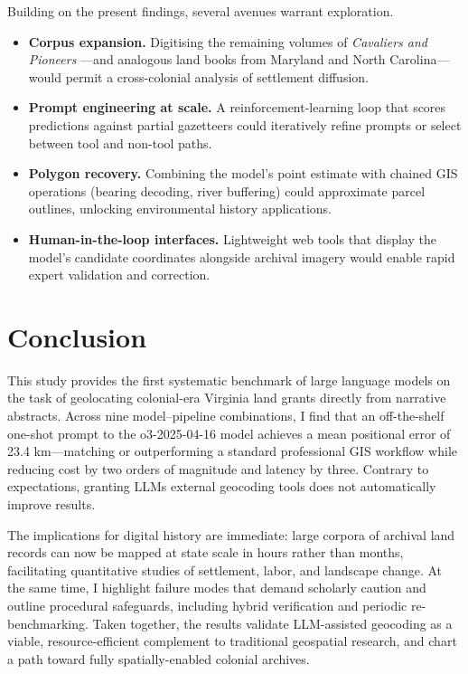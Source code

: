 Building on the present findings, several avenues warrant exploration.

\begin{itemize}
\tightlist
\item
  \textbf{Corpus expansion.} Digitising the remaining volumes of
  \emph{Cavaliers and Pioneers} \citep{Nugent1979_cavaliers3}---and
  analogous land books from Maryland and North Carolina---would permit a
  cross-colonial analysis of settlement diffusion.
\item
  \textbf{Prompt engineering at scale.} A reinforcement-learning loop
  that scores predictions against partial gazetteers could iteratively
  refine prompts or select between tool and non-tool paths.
\item
  \textbf{Polygon recovery.} Combining the model's point estimate with
  chained GIS operations (bearing decoding, river buffering) could
  approximate parcel outlines, unlocking environmental history
  applications.
\item
  \textbf{Human-in-the-loop interfaces.} Lightweight web tools that
  display the model's candidate coordinates alongside archival imagery
  would enable rapid expert validation and correction.
\end{itemize}

\section{Conclusion}\label{conclusion}

This study provides the first systematic benchmark of large language
models on the task of geolocating colonial-era Virginia land grants
directly from narrative abstracts. Across nine model--pipeline
combinations, I find that an off-the-shelf one-shot prompt to the
o3-2025-04-16 model achieves a mean positional error of 23.4
km---matching or outperforming a standard professional GIS workflow
while reducing cost by two orders of magnitude and latency by three.
Contrary to expectations, granting LLMs external geocoding tools does
not automatically improve results.

The implications for digital history are immediate: large corpora of
archival land records can now be mapped at state scale in hours rather
than months, facilitating quantitative studies of settlement, labor, and
landscape change. At the same time, I highlight failure modes that
demand scholarly caution and outline procedural safeguards, including
hybrid verification and periodic re-benchmarking. Taken together, the
results validate LLM-assisted geocoding as a viable, resource-efficient
complement to traditional geospatial research, and chart a path toward
fully spatially-enabled colonial archives.

